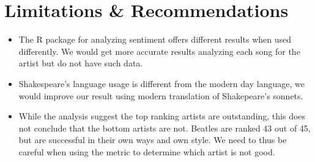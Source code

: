 \documentclass[10pt,a4paper]{article}
\begin{document}
\section{Limitations \& Recommendations}
\begin{itemize}

\item The R package for analyzing sentiment offers different results when used differently. We would get more accurate results analyzing each song for the artist but do not have such data.
\item Shakespeare’s language usage is different from the modern day language, we would improve our result using modern translation of Shakepeare’s sonnets.
\item While the analysis suggest the top ranking artists are outstanding, this does not conclude that the bottom artists are not. Beatles are ranked 43 out of 45, but are successful in their own ways and own style. We need to thus be careful when using the metric to determine which artist is not good.

\end{itemize}
\end{document}

